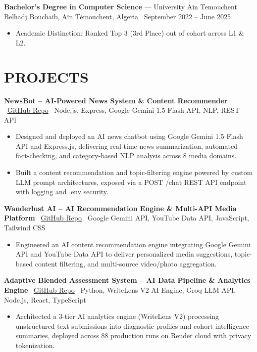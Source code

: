 \documentclass[10pt, letterpaper]{article}
\newcommand{\entry}[4]{%
  \noindent\textbf{#1} --- #3, #4 \textbar\ #2\par
  \vspace{0.5pt}
}
\newcommand{\projectentry}[2]{%
  \noindent\textbf{#1} \textbar\ #2\par
  \vspace{0.5pt}
}
\newcommand{\resumeItem}[1]{\item #1}
\begin{document}
\entry{Bachelor's Degree in Computer Science}{September 2022 -- June 2025}{University Ain Temouchent Belhadj Bouchaib}{Aïn Témouchent, Algeria}
\begin{itemize}
  \resumeItem{Academic Distinction: Ranked Top 3 (3rd Place) out of cohort across L1 \& L2.}
\end{itemize}

\section{PROJECTS}

\projectentry{NewsBot -- AI-Powered News System \& Content Recommender}{\href{https://github.com/benoualiabdelkader/NewsBot}{GitHub Repo} \textbar\ Node.js, Express, Google Gemini 1.5 Flash API, NLP, REST API}
\begin{itemize}
  \resumeItem{Designed and deployed an AI news chatbot using Google Gemini 1.5 Flash API and Express.js, delivering real-time news summarization, automated fact-checking, and category-based NLP analysis across 8 media domains.}
  \resumeItem{Built a content recommendation and topic-filtering engine powered by custom LLM prompt architectures, exposed via a POST /chat REST API endpoint with logging and .env security.}
\end{itemize}

\projectentry{Wanderlust AI -- AI Recommendation Engine \& Multi-API Media Platform}{\href{https://github.com/benoualiabdelkader/Wanderlust-AI}{GitHub Repo} \textbar\ Google Gemini API, YouTube Data API, JavaScript, Tailwind CSS}
\begin{itemize}
  \resumeItem{Engineered an AI content recommendation engine integrating Google Gemini API and YouTube Data API to deliver personalized media suggestions, topic-based content filtering, and multi-source video/photo aggregation.}
\end{itemize}

\projectentry{Adaptive Blended Assessment System -- AI Data Pipeline \& Analytics Engine}{\href{https://github.com/benoualiabdelkader/Adaptive-Blended-Assessment-}{GitHub Repo} \textbar\ Python, WriteLens V2 AI Engine, Groq LLM API, Node.js, React, TypeScript}
\begin{itemize}
  \resumeItem{Architected a 3-tier AI analytics engine (WriteLens V2) processing unstructured text submissions into diagnostic profiles and cohort intelligence summaries, deployed across 88 production runs on Render cloud with privacy tokenization.}
\end{itemize}
\end{document}
